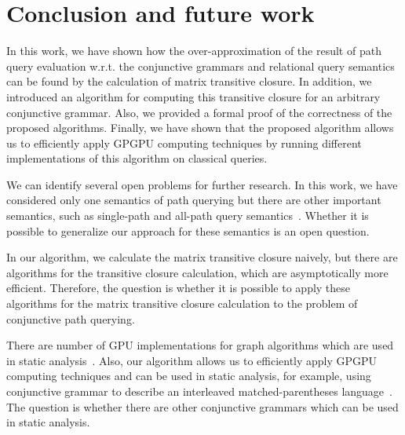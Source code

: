 \section{Conclusion and future work} \label{section_conclusion}
In this work, we have shown how the over-approximation of the result of path query evaluation w.r.t. the conjunctive grammars and relational query semantics can be found by the calculation of matrix transitive closure. In addition, we introduced an algorithm for computing this transitive closure for an arbitrary conjunctive grammar. Also, we provided a formal proof of the correctness of the proposed algorithms. Finally, we have shown that the proposed algorithm allows us to efficiently apply GPGPU computing techniques by running different implementations of this algorithm on classical queries. 

We can identify several open problems for further research. In this work, we have considered only one semantics of path querying but there are other important semantics, such as single-path and all-path query semantics~\cite{hellingsPathQuerying}. Whether it is possible to generalize our approach for these semantics is an open question.

In our algorithm, we calculate the matrix transitive closure naively, but there are algorithms for the transitive closure calculation, which are asymptotically more efficient. Therefore, the question is whether it is possible to apply these algorithms for the matrix transitive closure calculation to the problem of conjunctive path querying.

There are number of GPU implementations for graph algorithms which are used in static analysis~\cite{mendez2012gpu,su2013accelerating,su2016efficient}. Also, our algorithm  allows us to efficiently apply GPGPU computing techniques and can be used in static analysis, for example, using conjunctive grammar to describe an interleaved matched-parentheses language~\cite{zhang2017context}. The question is whether there are other conjunctive grammars which can be used in static analysis.
